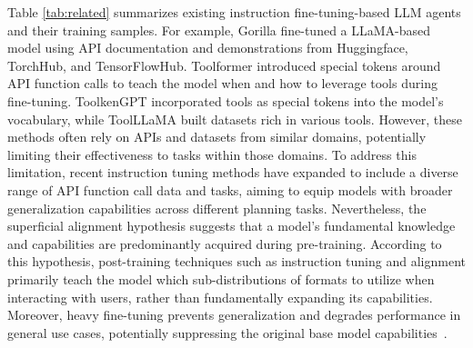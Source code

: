 Table \ref{tab:related} summarizes existing instruction fine-tuning-based LLM agents and their training samples.
For example, Gorilla \citep{patil2023gorilla} fine-tuned a LLaMA-based model using API documentation and demonstrations from Huggingface, TorchHub, and TensorFlowHub. Toolformer \citep{schick2024toolformer} introduced special tokens around API function calls to teach the model when and how to leverage tools during fine-tuning. ToolkenGPT \citep{hao2024toolkengpt} incorporated tools as special tokens into the model's vocabulary, while ToolLLaMA \citep{qin2023toolllm} built datasets rich in various tools.
However, these methods often rely on APIs and datasets from similar domains, potentially limiting their effectiveness to tasks within those domains. To address this limitation, recent instruction tuning methods \citep{achiam2023gpt, srinivasan2023nexusraven, zeng2023agenttuning, chen2024agent} have expanded to include a diverse range of API function call data and tasks, aiming to equip models with broader generalization capabilities across different planning tasks.
Nevertheless, the superficial alignment hypothesis \citep{zhou2024lima} suggests that a model's fundamental knowledge and capabilities are predominantly acquired during pre-training. According to this hypothesis, post-training techniques such as instruction tuning and alignment primarily teach the model which sub-distributions of formats to utilize when interacting with users, rather than fundamentally expanding its capabilities.
Moreover, heavy fine-tuning prevents generalization and degrades performance in general use cases, potentially suppressing the original base model capabilities~\cite{ghosh2024a}.

